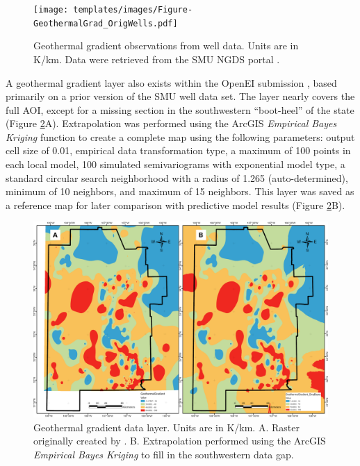 \begin{figure}[H]
\centering
\texttt{[image: templates/images/Figure-GeothermalGrad\_OrigWells.pdf]}
\caption[Geothermal gradient well data]{Geothermal gradient observations from well data. Units are in K/km. Data were retrieved from the SMU NGDS portal \protect\citep{smu_geothermal_2021}.}
\label{fig:feat_geotherm_gradient}
\end{figure}
\pagebreak

A geothermal gradient layer also exists within the \citeauthor{bielicki_hydrogeolgic_2015} OpenEI submission \citep{kelley_geothermal_2015}, based primarily on a prior version of the SMU well data set. The layer nearly covers the full AOI, except for a missing section in the southwestern ``boot-heel'' of the state (Figure \ref{fig:feat_pfa_geotherm_gradient}A). Extrapolation was performed using the ArcGIS \textit{Empirical Bayes Kriging} function to create a complete map using the following parameters: output cell size of 0.01, empirical data transformation type, a maximum of 100 points in each local model, 100 simulated semivariograms with exponential model type, a standard circular search neighborhood with a radius of 1.265 (auto-determined), minimum of 10 neighbors, and maximum of 15 neighbors. This layer was saved as a reference map for later comparison with predictive model results (Figure \ref{fig:feat_pfa_geotherm_gradient}B).  

\begin{figure}[H]
\centering
\includegraphics[width=\linewidth]{templates/images/Figure-PFA_Geothermal_Gradient_sidebyside.png}
\caption[Geothermal gradient data layer]{Geothermal gradient data layer. Units are in K/km. A. Raster originally created by \protect\citet{bielicki_hydrogeolgic_2015}. B. Extrapolation performed using the ArcGIS \textit{Empirical Bayes Kriging} to fill in the southwestern data gap.}
\label{fig:feat_pfa_geotherm_gradient}
\end{figure}

